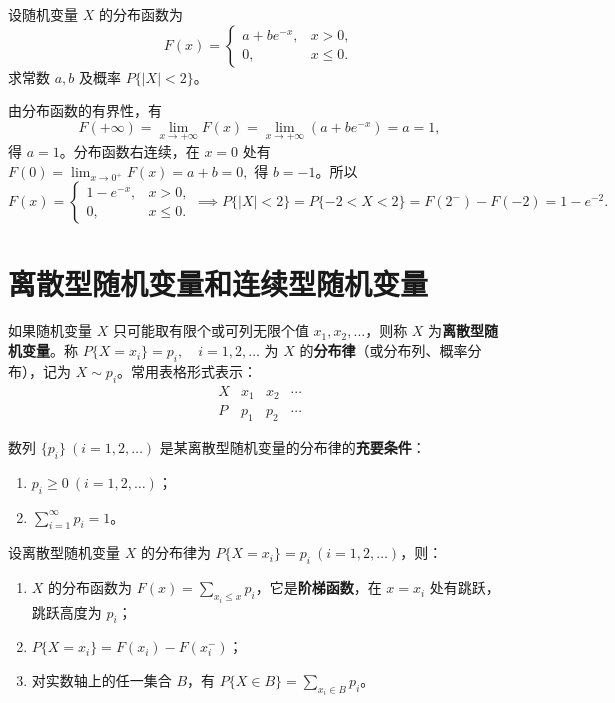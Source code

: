 \documentclass[lang=cn,11pt]{elegantbook}
\begin{document}
\begin{exercise}\label{exer:2-3}
设随机变量 \(X\) 的分布函数为
\[
F(x) = \begin{cases}
a + b e^{-x}, & x > 0, \\
0, & x \le 0.
\end{cases}
\]
求常数 \(a, b\) 及概率 \(P\{|X| < 2\}\)。
\end{exercise}

\begin{solution}
由分布函数的有界性，有
\[
F(+\infty) = \lim_{x \to +\infty} F(x) = \lim_{x \to +\infty} (a + b e^{-x}) = a = 1,
\]
得 \(a = 1\)。分布函数右连续，在 \(x=0\) 处有
\(
F(0) = \lim_{x \to 0^+} F(x) = a + b = 0,
\)
得 \(b = -1\)。所以
\[
F(x) = \begin{cases}
1 - e^{-x}, & x > 0, \\
0, & x \le 0.
\end{cases}
\implies
P\{|X| < 2\} = P\{-2 < X < 2\} = F(2^-) - F(-2) = 1 - e^{-2}.
\]
\end{solution}

\section{离散型随机变量和连续型随机变量}

\begin{definition}[离散型随机变量] \label{def:discrete-rv}
如果随机变量 $X$ 只可能取有限个或可列无限个值 $x_1, x_2, \dots$，则称 $X$ 为\textbf{离散型随机变量}。称
\(
P\{X = x_i\} = p_i, \quad i = 1, 2, \dots
\)
为 $X$ 的\textbf{分布律}（或分布列、概率分布），记为 $X \sim p_i$。常用表格形式表示：
\[
\begin{array}{c|cccc}
X & x_1 & x_2 & \cdots \\
\hline
P & p_1 & p_2 & \cdots
\end{array}
\]
\end{definition}

\begin{property}\label{prop:discrete-rv-condition}
数列 $\{p_i\}\ (i=1,2,\dots)$ 是某离散型随机变量的分布律的\textbf{充要条件}：
\begin{enumerate}
    \item $p_i \ge 0\ (i = 1, 2, \dots)$；
    \item $\displaystyle\sum_{i=1}^{\infty} p_i = 1$。
\end{enumerate}
设离散型随机变量 $X$ 的分布律为 $P\{X = x_i\} = p_i\ (i=1,2,\dots)$，则：
\begin{enumerate}
    \item $X$ 的分布函数为 $\displaystyle F(x) = \sum_{x_i \le x} p_i$，它是\textbf{阶梯函数}，在 $x = x_i$ 处有跳跃，跳跃高度为 $p_i$；
    \item $P\{X = x_i\} = F(x_i) - F(x_i^-)$；
    \item 对实数轴上的任一集合 $B$，有 $\displaystyle P\{X \in B\} = \sum_{x_i \in B} p_i$。
\end{enumerate}
\end{property}
\end{document}
